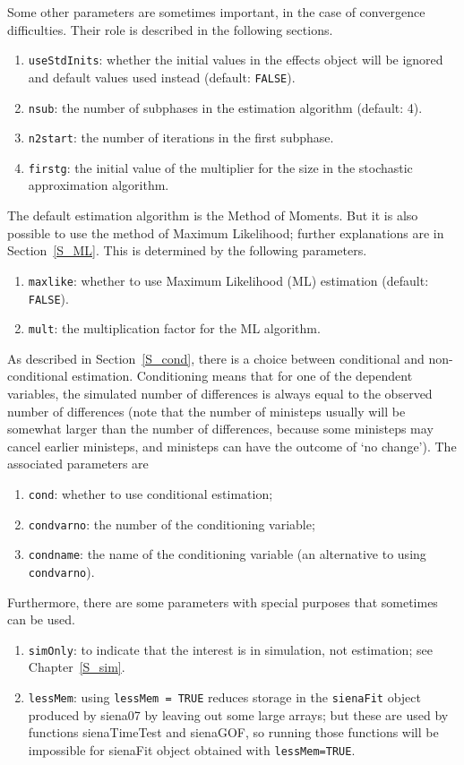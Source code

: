 \documentclass[a4paper,fleqn,11pt]{article}
\newcommand{\+}{\, + \,}
\newcommand{\sfn}[1]{\textsf{#1}}
\begin{document}
Some other parameters are sometimes important, in the case of convergence
difficulties.  Their role is described in the following sections.
\begin{enumerate}[resume]
  \item \texttt{useStdInits}: whether the initial values in the effects
    object will be ignored and default values used instead (default: \texttt{FALSE}).
  \item \texttt{nsub}:  the number of subphases in the estimation algorithm
    (default: 4).
  \item \texttt{n2start}: the number of iterations in the first subphase.
  \item \texttt{firstg}: the initial value of the multiplier for the size in the
       stochastic approximation algorithm.
\end{enumerate}
The default estimation algorithm is the Method of Moments. But it is also possible
to use the method of Maximum Likelihood; further explanations are in Section~\ref{S_ML}.
This is determined by the following parameters.
\begin{enumerate}[resume]
  \item \texttt{maxlike}: whether to use Maximum Likelihood (ML) estimation
       (default: \texttt{FALSE}).
  \item \texttt{mult}: the multiplication factor for the ML algorithm.
\end{enumerate}
As described in Section~\ref{S_cond}, there is a choice between conditional
and non-conditional estimation. Conditioning means that for one of the
dependent variables, the simulated number of differences is always equal to
the observed number of differences (note that the number of ministeps usually will
be somewhat larger than the number of differences, because some ministeps
may cancel earlier ministeps, and ministeps can have the outcome of
`no change'). The associated parameters are
\begin{enumerate}[resume]
  \item \texttt{cond}: whether to use conditional estimation;
  \item \texttt{condvarno}: the number of the conditioning variable;
  \item \texttt{condname}: the name of the conditioning variable (an alternative
      to using \texttt{condvarno}).
\end{enumerate}
Furthermore, there are some parameters with special purposes that sometimes
can be used.
\begin{enumerate}[resume]
  \item \texttt{simOnly}: to indicate that the interest is in simulation,
       not estimation; see Chapter~\ref{S_sim}.
  \item \texttt{lessMem}: using \texttt{lessMem~=~TRUE} reduces storage in
      the \texttt{sienaFit} object produced by \sfn{siena07} by leaving out
      some large arrays; but these are used by functions
     \sfn{sienaTimeTest} and \sfn{sienaGOF}, so running those functions will be impossible
     for \sfn{sienaFit} object obtained with \texttt{lessMem=TRUE}.
\end{enumerate}
\end{document}

